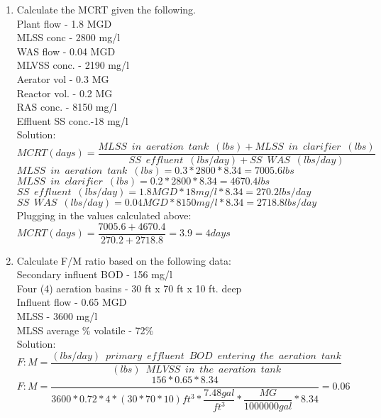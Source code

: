 \documentclass{article}
\begin{document}
\begin{enumerate}
\item Calculate the MCRT given the following.\\
Plant flow - 1.8 MGD\\
MLSS conc -  2800 mg/l\\
WAS flow - 0.04 MGD\\
MLVSS conc. - 2190 mg/l\\
Aerator vol - 0.3 MG\\
Reactor vol. - 0.2 MG\\
RAS conc. - 8150 mg/l\\
Effluent SS conc.-18 mg/l\\
Solution:\\
\vspace{0.2cm}
$MCRT (days) =  \dfrac{MLSS \enspace in \enspace aeration \enspace tank \enspace (lbs)+MLSS \enspace in \enspace clarifier \enspace (lbs)}{SS \enspace effluent \enspace (lbs/day)+SS \enspace WAS \enspace (lbs/day)}$\\
\vspace{0.3cm} 
$MLSS \enspace in \enspace aeration \enspace tank \enspace (lbs)=0.3*2800*8.34=7005.6lbs$\\
\vspace{0.3cm} 
$MLSS \enspace in \enspace clarifier \enspace (lbs)=0.2*2800*8.34=4670.4lbs$\\
\vspace{0.3cm} 
$SS \enspace effluent \enspace (lbs/day)=1.8MGD *18mg/l*8.34=270.2lbs/day$\\
\vspace{0.3cm} 
$SS \enspace WAS \enspace (lbs/day)=0.04MGD *8150mg/l*8.34=2718.8lbs/day$\\
\vspace{0.3cm} 
Plugging in the values calculated above: $MCRT (days) =  \dfrac{7005.6+4670.4}{270.2+2718.8}=3.9=\boxed{4days}$\\
\vspace{0.2cm}
\pagebreak



\item Calculate F/M ratio based on the following data:\\
Secondary influent BOD - 156 mg/l\\
Four (4) aeration basins - 30 ft x 70 ft x 10 ft. deep\\
Influent flow - 0.65 MGD\\
MLSS - 3600 mg/l\\
MLSS average \% volatile - 72\%\\
Solution:\\
\vspace{0.3cm}
$F:M=\dfrac{(lbs/day) \enspace primary \enspace effluent  \enspace BOD \enspace entering \enspace the  \enspace aeration \enspace tank}{(lbs) \enspace MLVSS \enspace in \enspace the  \enspace aeration \enspace tank}$\\
\vspace{0.3cm}
$F:M=\dfrac{156*0.65*8.34}{3600*0.72*4*(30*70*10)ft^3* \dfrac{7.48gal}{ft^3}*\dfrac{MG}{1000000gal}*8.34}=\boxed{0.06}$\\



\end{enumerate}
\end{document}
